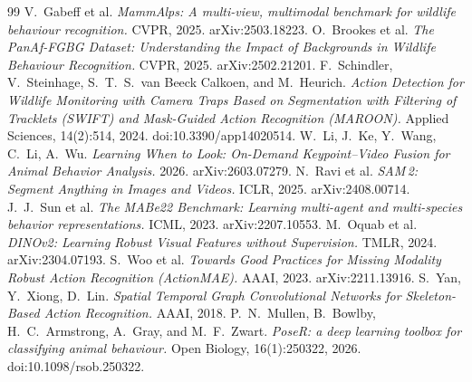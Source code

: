 \documentclass[11pt]{article}
\begin{document}
\begin{thebibliography}{99}
 V.~Gabeff et al. \emph{MammAlps: A multi-view, multimodal benchmark for wildlife behaviour recognition.} CVPR, 2025. arXiv:2503.18223.
 O.~Brookes et al. \emph{The PanAf-FGBG Dataset: Understanding the Impact of Backgrounds in Wildlife Behaviour Recognition.} CVPR, 2025. arXiv:2502.21201.
 F.~Schindler, V.~Steinhage, S.~T.~S.~van Beeck Calkoen, and M.~Heurich. \emph{Action Detection for Wildlife Monitoring with Camera Traps Based on Segmentation with Filtering of Tracklets (SWIFT) and Mask-Guided Action Recognition (MAROON).} Applied Sciences, 14(2):514, 2024. doi:10.3390/app14020514.
 W.~Li, J.~Ke, Y.~Wang, C.~Li, A.~Wu. \emph{Learning When to Look: On-Demand Keypoint--Video Fusion for Animal Behavior Analysis.} 2026. arXiv:2603.07279.
 N.~Ravi et al. \emph{SAM\,2: Segment Anything in Images and Videos.} ICLR, 2025. arXiv:2408.00714.
 J.~J.~Sun et al. \emph{The MABe22 Benchmark: Learning multi-agent and multi-species behavior representations.} ICML, 2023. arXiv:2207.10553.
 M.~Oquab et al. \emph{DINOv2: Learning Robust Visual Features without Supervision.} TMLR, 2024. arXiv:2304.07193.
 S.~Woo et al. \emph{Towards Good Practices for Missing Modality Robust Action Recognition (ActionMAE).} AAAI, 2023. arXiv:2211.13916.
 S.~Yan, Y.~Xiong, D.~Lin. \emph{Spatial Temporal Graph Convolutional Networks for Skeleton-Based Action Recognition.} AAAI, 2018.
 P.~N.~Mullen, B.~Bowlby, H.~C.~Armstrong, A.~Gray, and M.~F.~Zwart. \emph{PoseR: a deep learning toolbox for classifying animal behaviour.} Open Biology, 16(1):250322, 2026. doi:10.1098/rsob.250322.
\end{thebibliography}
\end{document}
